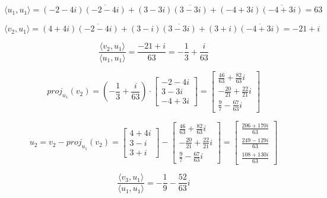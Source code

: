 \documentclass{article}
\begin{document}
\begin{equation}
    \langle u_1,u_1 \rangle =(-2-4i)\overline{(-2-4i)}+(3-3i)\overline{(3-3i)}+(-4+3i)\overline{(-4+3i)}=63\nonumber
\end{equation}

\begin{equation}
    \langle v_2,u_1 \rangle =(4+4i)\overline{(-2-4i)}+(3-i)\overline{(3-3i)}+(3+i)\overline{(-4+3i)}=-21+i\nonumber
\end{equation}

\begin{equation}
    \frac{\langle v_2,u_1 \rangle}{\langle u_1,u_1 \rangle}
    = \frac{-21+i}{63}
    = -\frac{1}{3} + \frac{i}{63} \nonumber
\end{equation}

\begin{equation}
    proj_{u_1}(v_2)
    =
    (-\frac{1}{3} + \frac{i}{63}) 
    \cdot
\begin{bmatrix}
    -2-4i\\
    3-3i\\
    -4+3i
\end{bmatrix}
=
\begin{bmatrix}
    \frac{46}{63}+\frac{82}{63}i\\
    -\frac{20}{21}+\frac{22}{21}i\\
    \frac{9}{7}-\frac{67}{63}i
\end{bmatrix}
\nonumber
\end{equation}


\begin{equation}
    u_2 = 
    v_2 - proj_{u_1}(v_2)
    =
\begin{bmatrix}
    4+4i\\
    3-i\\
    3+i
\end{bmatrix}
-
\begin{bmatrix}
    \frac{46}{63}+\frac{82}{63}i\\
    -\frac{20}{21}+\frac{22}{21}i\\
    \frac{9}{7}-\frac{67}{63}i
\end{bmatrix}
=
\begin{bmatrix}
    \frac{206+170i}{63}\\
    \frac{249-129i}{63}\\
    \frac{108+130i}{63}
\end{bmatrix}
\nonumber
\end{equation}

\begin{equation}
    \frac{\langle v_3,u_1 \rangle}{\langle u_1,u_1 \rangle}
    = -\frac{1}{9}-\frac{52}{63}i\nonumber
\end{equation}
\end{document}

